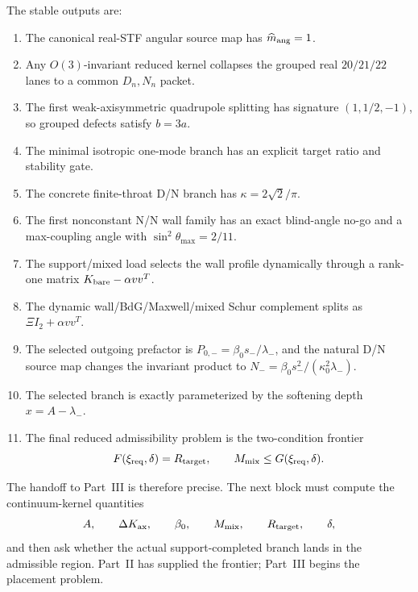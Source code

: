The stable outputs are:
\begin{enumerate}[leftmargin=2.2em]
\item The canonical real-STF angular source map has \(\widehat m_{\rm ang}=1\).
\item Any \(O(3)\)-invariant reduced kernel collapses the grouped real \(20/21/22\) lanes to a common \(D_n,N_n\) packet.
\item The first weak-axisymmetric quadrupole splitting has signature \((1,1/2,-1)\), so grouped defects satisfy \(b=3a\).
\item The minimal isotropic one-mode branch has an explicit target ratio and stability gate.
\item The concrete finite-throat D/N branch has \(\kappa=2\sqrt2/\pi\).
\item The first nonconstant N/N wall family has an exact blind-angle no-go and a max-coupling angle with \(\sin^2\theta_{\max}=2/11\).
\item The support/mixed load selects the wall profile dynamically through a rank-one matrix \(K_{\rm bare}-\alpha vv^T\).
\item The dynamic wall/BdG/Maxwell/mixed Schur complement splits as \(\Xi I_2+\alpha vv^T\).
\item The selected outgoing prefactor is \(P_{0,-}=\beta_0s_-/\lambda_-\), and the natural D/N source map changes the invariant product to \(N_-=\beta_0s_-^2/(\kappa_0^2\lambda_-)\).
\item The selected branch is exactly parameterized by the softening depth \(x=A-\lambda_-\).
\item The final reduced admissibility problem is the two-condition frontier
\begin{equation}
F(\xi_{\rm req},\delta)=R_{\rm target},
\qquad
M_{\rm mix}\leq G(\xi_{\rm req},\delta).
\end{equation}
\end{enumerate}

The handoff to Part~III is therefore precise.  The next block must compute the continuum-kernel quantities
\begin{equation}
A,
\qquad
\Delta K_{\rm ax},
\qquad
\beta_0,
\qquad
M_{\rm mix},
\qquad
R_{\rm target},
\qquad
\delta,
\end{equation}
and then ask whether the actual support-completed branch lands in the admissible region.  Part~II has supplied the frontier; Part~III begins the placement problem.
